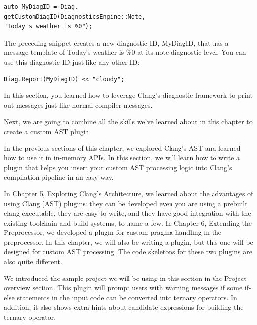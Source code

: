 \begin{enumerate}
\begin{lstlisting}[style=styleJavaScript]
auto MyDiagID = Diag.
getCustomDiagID(DiagnosticsEngine::Note,
"Today's weather is %0");
\end{lstlisting}

The preceding snippet creates a new diagnostic ID, MyDiagID, that has a message template of Today's weather is \%0 at its note diagnostic level. You can use this diagnostic ID just like any other ID:

\begin{lstlisting}[style=styleJavaScript]
Diag.Report(MyDiagID) << "cloudy";
\end{lstlisting}

\end{enumerate}

In this section, you learned how to leverage Clang's diagnostic framework to print out messages just like normal compiler messages.

Next, we are going to combine all the skills we've learned about in this chapter to create a custom AST plugin.


In the previous sections of this chapter, we explored Clang's AST and learned how to use it in in-memory APIs. In this section, we will learn how to write a plugin that helps you insert your custom AST processing logic into Clang's compilation pipeline in an easy way.

In Chapter 5, Exploring Clang's Architecture, we learned about the advantages of using Clang (AST) plugins: they can be developed even you are using a prebuilt clang executable, they are easy to write, and they have good integration with the existing toolchain and build systems, to name a few. In Chapter 6, Extending the Preprocessor, we developed a plugin for custom pragma handling in the preprocessor. In this chapter, we will also be writing a plugin, but this one will be designed for custom AST processing. The code skeletons for these two plugins are also quite different.

We introduced the sample project we will be using in this section in the Project overview section. This plugin will prompt users with warning messages if some if-else statements in the input code can be converted into ternary operators. In addition, it also shows extra hints about candidate expressions for building the ternary operator.

